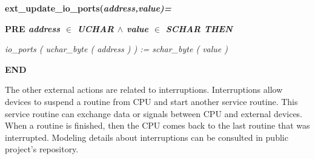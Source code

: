 \documentclass[a4paper]{llncs}
\begin{document}
\hspace*{0.00in}\bf ext\_update\_io\_ports\rm (\it address\rm ,\it value\rm )\rm =

\hspace*{0.20in}\bf PRE \it address  $\in$  \it UCHAR  $\land$ \hspace*{0.10in}\it value  $\in$  \it SCHAR \bf THEN

\hspace*{0.20in}\it io\_ports \rm ( \it uchar\_byte \rm ( \it address \rm ) \rm ) \rm := \it schar\_byte \rm ( \it
value \rm )

\hspace*{0.00in}\bf END\rm 

The other external actions are related to interruptions. Interruptions allow
devices to suspend a routine from CPU and start another service routine.
This service routine can exchange data or signals between CPU and external
devices. When a routine is finished, then the CPU comes back to the last routine
that was interrupted. Modeling details about interruptions can be consulted in
public project's repository.
\end{document}
